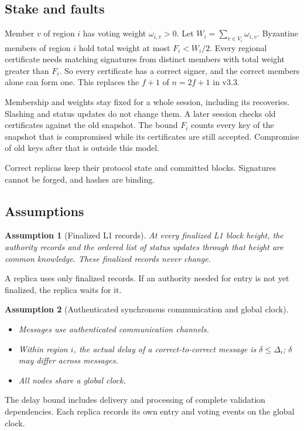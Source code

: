 \documentclass[11pt,a4paper]{article}
\newtheorem{assumption}[assumption]{Assumption}
\newcounter{protocol}
\begin{document}
\subsection{Stake and faults}
\label{sec:stake}
Member $v$ of region $i$ has voting weight $\omega_{i,v}>0$. Let
$W_i=\sum_{v\in V_i}\omega_{i,v}$. Byzantine members of region $i$ hold
total weight at most $F_i<W_i/2$. Every regional certificate needs
matching signatures from distinct members with total weight greater than
$F_i$. So every certificate has a correct signer, and the correct members
alone can form one. This replaces the $f+1$ of $n=2f+1$ in v3.3.

Membership and weights stay fixed for a whole session, including its
recoveries. Slashing and status updates do not change them. A later
session checks old certificates against the old snapshot. The bound
$F_i$ counts every key of the snapshot that is compromised while its
certificates are still accepted. Compromise of old keys after that is
outside this model.

Correct replicas keep their protocol state and committed blocks.
Signatures cannot be forged, and hashes are binding.

\subsection{Assumptions}
\label{sec:assumptions}
\begin{assumption}[Finalized L1 records]
\label{ass:authority}
At every finalized L1 block height, the authority records and the ordered
list of status updates through that height are common knowledge. These
finalized records never change.
\end{assumption}
A replica uses only finalized records. If an authority needed for entry
is not yet finalized, the replica waits for it.

\begin{assumption}[Authenticated synchronous communication and global clock]
\label{ass:network}
\leavevmode\par
\begin{itemize}
\item Messages use authenticated communication channels.
\item Within region $i$, the actual delay of a correct-to-correct
message is $\delta\le\Delta_i$; $\delta$ may differ across messages.
\item All nodes share a global clock.
\end{itemize}
\end{assumption}
The delay bound includes delivery and processing of complete validation
dependencies. Each replica records its own entry and voting events on
the global clock.
\end{document}
